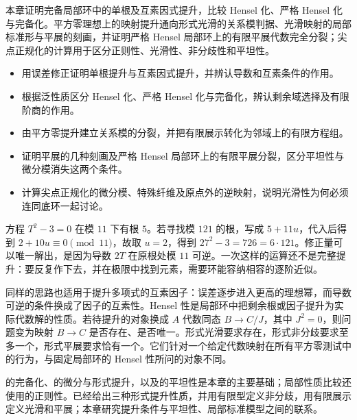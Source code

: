 

\begin{chapterabstract}
	本章证明完备局部环中的单根及互素因式提升，比较 Hensel 化、严格 Hensel 化与完备化。平方零理想上的映射提升通向形式光滑的关系模判据、光滑映射的局部标准形与平展的刻画，并证明严格 Hensel 局部环上的有限平展代数完全分裂；尖点正规化的计算用于区分正则性、光滑性、非分歧性和平坦性。
\end{chapterabstract}

\begin{learninggoals}
	\begin{itemize}
		\item 用误差修正证明单根提升与互素因式提升，并辨认导数和互素条件的作用。
		\item 根据泛性质区分 Hensel 化、严格 Hensel 化与完备化，辨认剩余域选择及有限阶商的作用。
		\item 由平方零提升建立关系模的分裂，并把有限展示转化为邻域上的有限方程组。
		\item 证明平展的几种刻画及严格 Hensel 局部环上的有限平展分裂，区分平坦性与微分模消失这两个条件。
		\item 计算尖点正规化的微分模、特殊纤维及原点外的逆映射，说明光滑性为何必须连同底环一起讨论。
	\end{itemize}
\end{learninggoals}

方程 \(T^2-3=0\) 在模 \(11\) 下有根 \(5\)。若寻找模 \(121\) 的根，写成 \(5+11u\)，代入后得到 \(2+10u\equiv0\pmod{11}\)，故取 \(u=2\)，得到 \(27^2-3=726=6\cdot121\)。修正量可以唯一解出，是因为导数 \(2T\) 在原根处模 \(11\) 可逆。一次这样的运算还不是完整提升：要反复作下去，并在极限中找到元素，需要环能容纳相容的逐阶近似。

\ProseParagraphBreak

同样的思路也适用于提升多项式的互素因子：误差逐步进入更高的理想幂，而导数可逆的条件换成了因子的互素性。Hensel 性是局部环中把剩余根或因子提升为实际代数解的性质。若待提升的对象换成 \(A\) 代数同态 \(B\to C/J\)，其中 \(J^2=0\)，则问题变为映射 \(B\to C\) 是否存在、是否唯一。形式光滑要求存在，形式非分歧要求至多一个，形式平展要求恰有一个。它们针对一个给定代数映射在所有平方零测试中的行为，与固定局部环的 Hensel 性所问的对象不同。

\ProseParagraphBreak

的完备化、的微分与形式提升，以及的平坦性是本章的主要基础；局部性质比较还使用的正则性。已经给出三种形式提升性质，并用有限型定义非分歧，用有限展示定义光滑和平展；本章研究提升条件与平坦性、局部标准模型之间的联系。


